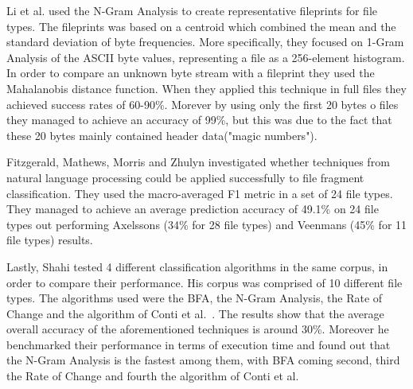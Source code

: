 
Li et al.\cite{ngram} used the N-Gram Analysis to create representative fileprints for file types. The fileprints was based on a centroid which combined the mean and the standard deviation of byte frequencies. More specifically, they focused on 1-Gram Analysis of the ASCII byte values, representing a file as a 256-element histogram. In order to compare an unknown byte stream with a fileprint they used the Mahalanobis distance function. When they applied this technique in full files they achieved success rates of 60-90\%. Morever by using only the first 20 bytes o files they managed to achieve an accuracy of 99\%, but this was due to the fact that these 20 bytes mainly contained header data("magic numbers").


Fitzgerald, Mathews, Morris and Zhulyn\cite{Fitz} investigated whether techniques from natural language processing could be applied successfully to file fragment classification. They used the macro-averaged F1 metric in a set of 24 file types. They managed to achieve an average prediction accuracy of 49.1\% on 24 file types out performing Axelssons (34\% for 28 file types) and Veenmans (45\% for 11 file types) results.

Lastly, Shahi\cite{Ashim} tested 4 different classification algorithms in the same corpus, in order to compare their performance. His corpus was comprised of 10 different file types. The algorithms used were the BFA\cite{MacDaniel}, the N-Gram Analysis\cite{ngram}, the Rate of Change\cite{roc} and the algorithm of Conti et al.~\cite{Conti}. The results show that the average overall accuracy of the aforementioned techniques is around 30\%. Moreover he benchmarked their performance in terms of execution time and found out that the N-Gram Analysis is the fastest among them, with BFA coming second, third the Rate of Change and fourth the algorithm of Conti et al.




